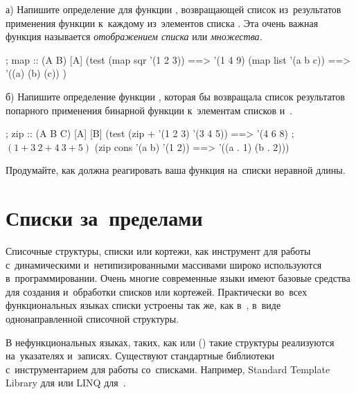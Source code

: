 \begin{Assignment}
а) Напишите определение для функции , возвращающей список из~результатов применения функции  к~каждому из~элементов списка . Эта очень важная функция называется \emph{отображением списка} или \emph{множества}.
\begin{Specification}
; map :: (A \arrow B) [A] \arrow [B]
(test 
  (map sqr '(1 2 3))  ==> '(1 4 9)
  (map list '(a b c)) ==> '((a) (b) (c)) )
\end{Specification}

б) Напишите определение функции , которая бы возвращала список результатов попарного применения бинарной функции  к~элементам списков  и~.
\begin{Specification}
; zip :: (A B \arrow C) [A] [B] \arrow [C]
(test 
  (zip + '(1 2 3) '(3 4 5)) ==> '(4 6 8)   ;$(1+3\ 2+4\ 3+5)$
  (zip cons '(a b) '(1 2))  ==> '((a . 1) (b . 2)))
\end{Specification}

Продумайте, как должна реагировать ваша функция на~списки неравной длины.
\end{Assignment}

\section{Списки за~пределами~\Scheme}%
Списочные структуры, списки или кортежи, как инструмент для работы с~динамическими и~нетипизированными массивами широко используются в~программировании. Очень многие современные языки имеют базовые средства для создания и~обработки списков или кортежей. Практически во~всех функциональных языках списки устроены так же, как в~\Scheme, в~виде однонаправленной списочной структуры.

В нефункциональных языках, таких, как  или  () такие структуры реализуются на~указателях и~записях. Существуют стандартные библиотеки с~инструментарием для работы со~списками. Например, Standard Template Library для  или LINQ для~.

